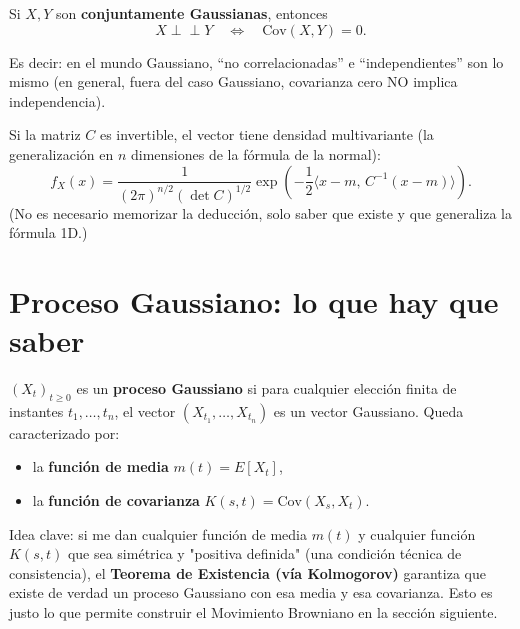 \documentclass[10pt]{book}
\begin{document}
\begin{prop}
Si $X,Y$ son \textbf{conjuntamente Gaussianas}, entonces
\begin{equation*}
    X\perp\!\!\!\perp Y \quad\Longleftrightarrow\quad \mathrm{Cov}(X,Y)=0.
\end{equation*}
\end{prop}

\noindent
Es decir: en el mundo Gaussiano, ``no correlacionadas'' e ``independientes'' son lo mismo (en general, fuera del caso Gaussiano, covarianza cero NO implica independencia).

\noindent
Si la matriz $C$ es invertible, el vector tiene densidad multivariante (la generalización en $n$ dimensiones de la fórmula de la normal):
\begin{equation*}
    f_X(x) = \frac{1}{(2\pi)^{n/2}(\det C)^{1/2}} \exp\left(-\frac12\langle x-m,\, C^{-1}(x-m)\rangle\right).
\end{equation*}
(No es necesario memorizar la deducción, solo saber que existe y que generaliza la fórmula 1D.)

\section{Proceso Gaussiano: lo que hay que saber}

\begin{definicion}
$(X_t)_{t\ge0}$ es un \textbf{proceso Gaussiano} si para cualquier elección finita de instantes $t_1,\dots,t_n$, el vector $(X_{t_1},\dots,X_{t_n})$ es un vector Gaussiano. Queda caracterizado por:
\begin{itemize}
    \item la \textbf{función de media} $m(t)=E[X_t]$,
    \item la \textbf{función de covarianza} $K(s,t)=\mathrm{Cov}(X_s,X_t)$.
\end{itemize}
\end{definicion}

\begin{observacion}
Idea clave: si me dan cualquier función de media $m(t)$ y cualquier función $K(s,t)$ que sea simétrica y "positiva definida" (una condición técnica de consistencia), el \textbf{Teorema de Existencia (vía Kolmogorov)} garantiza que existe de verdad un proceso Gaussiano con esa media y esa covarianza. Esto es justo lo que permite construir el Movimiento Browniano en la sección siguiente.
\end{observacion}
\end{document}
